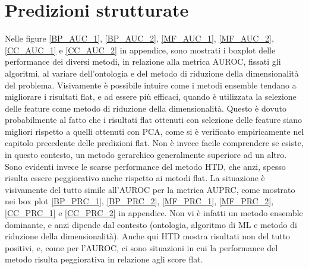 \documentclass[12pt]{report}
\begin{document}
\section{Predizioni strutturate}
Nelle figure \ref{BP_AUC_1}, \ref{BP_AUC_2}, \ref{MF_AUC_1}, \ref{MF_AUC_2}, \ref{CC_AUC_1} e \ref{CC_AUC_2} in appendice, sono mostrati i boxplot delle performance dei diversi metodi, in relazione alla metrica AUROC, fissati gli algoritmi, al variare dell'ontologia e del metodo di riduzione della dimensionalità del problema. Visivamente è possibile intuire come i metodi ensemble tendano a migliorare i risultati flat, e ad essere più efficaci, quando è utilizzata la selezione delle feature come metodo di riduzione della dimensionalità. Questo è dovuto probabilmente al fatto che i risultati flat ottenuti con selezione delle feature siano migliori rispetto a quelli ottenuti con PCA, come si è verificato empiricamente nel capitolo precedente delle predizioni flat. Non è invece facile comprendere se esiste, in questo contesto, un metodo gerarchico generalmente superiore ad un altro. Sono evidenti invece le scarse performance del metodo HTD, che anzi, spesso risulta essere peggiorativo anche rispetto ai metodi flat.
\newline
\newline
La situazione è visivamente del tutto simile all'AUROC per la metrica AUPRC, come mostrato nei box plot \ref{BP_PRC_1}, \ref{BP_PRC_2}, \ref{MF_PRC_1}, \ref{MF_PRC_2}, \ref{CC_PRC_1} e \ref{CC_PRC_2} in appendice. Non vi è infatti un metodo ensemble dominante, e anzi dipende dal contesto (ontologia, algoritmo di ML e metodo di riduzione della dimensionalità). Anche qui HTD mostra risultati non del tutto positivi, e, come per l'AUROC, ci sono situazioni in cui la performance del metodo risulta peggiorativa in relazione agli score flat.  
\end{document}
